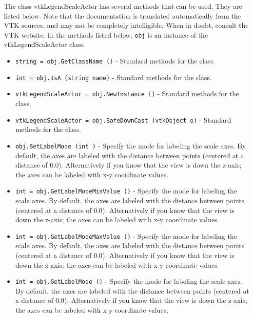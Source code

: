 The class vtkLegendScaleActor has several methods that can be used.
  They are listed below.
Note that the documentation is translated automatically from the VTK sources,
and may not be completely intelligible.  When in doubt, consult the VTK website.
In the methods listed below, \verb|obj| is an instance of the vtkLegendScaleActor class.
\begin{itemize}
\item  \verb|string = obj.GetClassName ()| -  Standard methods for the class.

\item  \verb|int = obj.IsA (string name)| -  Standard methods for the class.

\item  \verb|vtkLegendScaleActor = obj.NewInstance ()| -  Standard methods for the class.

\item  \verb|vtkLegendScaleActor = obj.SafeDownCast (vtkObject o)| -  Standard methods for the class.

\item  \verb|obj.SetLabelMode (int )| -  Specify the mode for labeling the scale axes. By default, the axes are
 labeled with the distance between points (centered at a distance of
 0.0). Alternatively if you know that the view is down the z-axis; the
 axes can be labeled with x-y coordinate values.

\item  \verb|int = obj.GetLabelModeMinValue ()| -  Specify the mode for labeling the scale axes. By default, the axes are
 labeled with the distance between points (centered at a distance of
 0.0). Alternatively if you know that the view is down the z-axis; the
 axes can be labeled with x-y coordinate values.

\item  \verb|int = obj.GetLabelModeMaxValue ()| -  Specify the mode for labeling the scale axes. By default, the axes are
 labeled with the distance between points (centered at a distance of
 0.0). Alternatively if you know that the view is down the z-axis; the
 axes can be labeled with x-y coordinate values.

\item  \verb|int = obj.GetLabelMode ()| -  Specify the mode for labeling the scale axes. By default, the axes are
 labeled with the distance between points (centered at a distance of
 0.0). Alternatively if you know that the view is down the z-axis; the
 axes can be labeled with x-y coordinate values.


\end{itemize}
